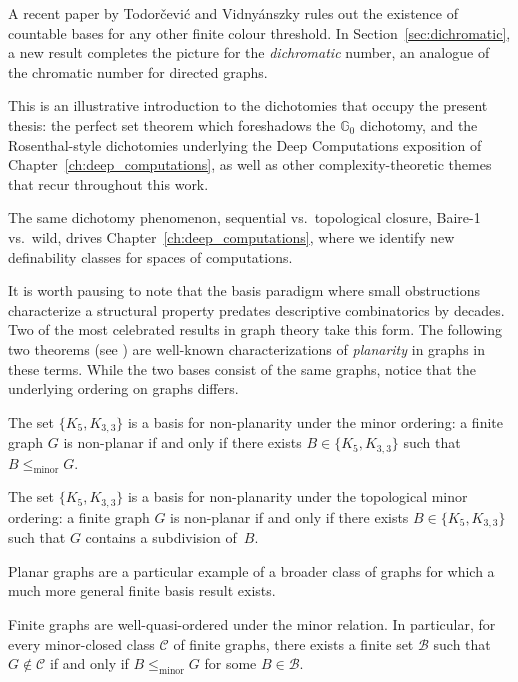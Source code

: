 A recent paper by Todor{\v{c}}evi{\'c} and Vidny{\'{a}}nszky \cite{Todorcevic_2021_ComplexProbBorel} rules out the existence of countable bases for any other finite colour threshold.
In Section~\ref{sec:dichromatic}, a new result completes the picture for the \emph{dichromatic} number, an analogue of the chromatic number for directed graphs.

This is an illustrative introduction to the dichotomies that occupy the present thesis: the perfect set theorem which foreshadows the $\mathbb{G}_0$ dichotomy, and the Rosenthal-style dichotomies underlying the Deep Computations exposition of Chapter~\ref{ch:deep_computations}, as well as other complexity-theoretic themes that recur throughout this work.

The same dichotomy phenomenon, sequential vs.\ topological closure, Baire-1 vs.\ wild, drives Chapter~\ref{ch:deep_computations}, where we identify new definability classes for spaces of computations.

It is worth pausing to note that the basis paradigm where small obstructions characterize a structural property predates descriptive combinatorics by decades.
Two of the most celebrated results in graph theory take this form.
The following two theorems (see \cite[Section~10.5]{bondy2008graph}) are well-known characterizations of \emph{planarity} in graphs in these terms.
While the two bases consist of the same graphs, notice that the underlying ordering on graphs differs.

\begin{theorem}[Wagner, 1937]\label{thm:wagner-basis}
    The set $\{K_5, K_{3,3}\}$ is a basis for non-planarity under the minor ordering: a finite graph $G$ is non-planar if and only if there exists $B \in \{K_5, K_{3,3}\}$ such that $B \leq_{\mathrm{minor}} G$.
\end{theorem}

\begin{theorem}[Kuratowski, 1930]\label{thm:kuratowski-basis}
    The set $\{K_5, K_{3,3}\}$ is a basis for non-planarity under the topological minor ordering: a finite graph $G$ is non-planar if and only if there exists $B \in \{K_5, K_{3,3}\}$ such that $G$ contains a subdivision of~$B$.
\end{theorem}

Planar graphs are a particular example of a broader class of graphs for which a much more general finite basis result exists.

\begin{theorem}\label{thm:robertson-seymour}
    Finite graphs are well-quasi-ordered under the minor relation.
    In particular, for every minor-closed class $\mathcal{C}$ of finite graphs, there exists a finite set $\mathcal{B}$ such that $G \notin \mathcal{C}$ if and only if $B \leq_{\mathrm{minor}} G$ for some $B \in \mathcal{B}$.
\end{theorem}

